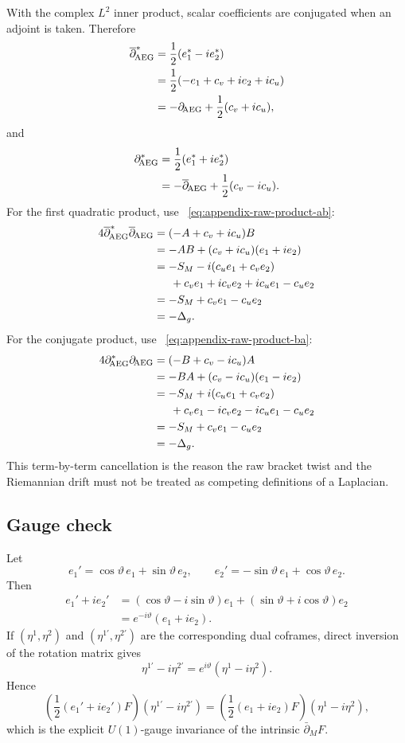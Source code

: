 With the complex $L^2$ inner product, scalar coefficients are conjugated when
an adjoint is taken.  Therefore
\begin{align*}
 \overline\partial_{\!\mathrm{AEG}}^*
 &=\frac12(e_1^*-ie_2^*)\\
 &=\frac12(-e_1+c_v+ie_2+ic_u)\\
 &=-\partial_{\!\mathrm{AEG}}+\frac12(c_v+ic_u),
\end{align*}
and
\begin{align*}
 \partial_{\!\mathrm{AEG}}^*
 &=\frac12(e_1^*+ie_2^*)\\
 &=-\overline\partial_{\!\mathrm{AEG}}+\frac12(c_v-ic_u).
\end{align*}
For the first quadratic product, use
~\eqref{eq:appendix-raw-product-ab}:
\begin{align*}
 4\overline\partial_{\!\mathrm{AEG}}^*\overline\partial_{\!\mathrm{AEG}}
 &=(-A+c_v+ic_u)B\\
 &=-AB+(c_v+ic_u)(e_1+ie_2)\\
 &=-S_M-i(c_ue_1+c_ve_2)\\
 &\hspace{1.5em}{}+c_ve_1+ic_ve_2+ic_ue_1-c_ue_2\\
 &=-S_M+c_ve_1-c_ue_2\\
 &=-\Delta_g.
\end{align*}
For the conjugate product, use
~\eqref{eq:appendix-raw-product-ba}:
\begin{align*}
 4\partial_{\!\mathrm{AEG}}^*\partial_{\!\mathrm{AEG}}
 &=(-B+c_v-ic_u)A\\
 &=-BA+(c_v-ic_u)(e_1-ie_2)\\
 &=-S_M+i(c_ue_1+c_ve_2)\\
 &\hspace{1.5em}{}+c_ve_1-ic_ve_2-ic_ue_1-c_ue_2\\
 &=-S_M+c_ve_1-c_ue_2\\
 &=-\Delta_g.
\end{align*}
This term-by-term cancellation is the reason the raw bracket twist and the
Riemannian drift must not be treated as competing definitions of a Laplacian.

\subsection{Gauge check}

Let
\[
 e_1'=\cos\vartheta\,e_1+\sin\vartheta\,e_2,
 \qquad
 e_2'=-\sin\vartheta\,e_1+\cos\vartheta\,e_2.
\]
Then
\begin{align*}
 e_1'+ie_2'
 &=(\cos\vartheta-i\sin\vartheta)e_1
   +(\sin\vartheta+i\cos\vartheta)e_2\\
 &=e^{-i\vartheta}(e_1+ie_2).
\end{align*}
If $(\eta^1,\eta^2)$ and $(\eta^{1'},\eta^{2'})$ are the corresponding
dual coframes, direct inversion of the rotation matrix gives
\[
 \eta^{1'}-i\eta^{2'}
 =e^{i\vartheta}(\eta^1-i\eta^2).
\]
Hence
\[
 \left(\frac12(e_1'+ie_2')F\right)
 (\eta^{1'}-i\eta^{2'})
 =
 \left(\frac12(e_1+ie_2)F\right)
 (\eta^1-i\eta^2),
\]
which is the explicit $U(1)$-gauge invariance of the intrinsic
$\bar\partial_MF$.

